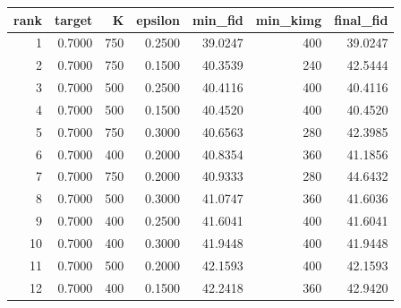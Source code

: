 \begin{tabular}{rrrrrrr}
\toprule
 rank &  target &   K &  epsilon &  min\_fid &  min\_kimg &  final\_fid \\
\midrule
    1 &  0.7000 & 750 &   0.2500 &  39.0247 &       400 &    39.0247 \\
    2 &  0.7000 & 750 &   0.1500 &  40.3539 &       240 &    42.5444 \\
    3 &  0.7000 & 500 &   0.2500 &  40.4116 &       400 &    40.4116 \\
    4 &  0.7000 & 500 &   0.1500 &  40.4520 &       400 &    40.4520 \\
    5 &  0.7000 & 750 &   0.3000 &  40.6563 &       280 &    42.3985 \\
    6 &  0.7000 & 400 &   0.2000 &  40.8354 &       360 &    41.1856 \\
    7 &  0.7000 & 750 &   0.2000 &  40.9333 &       280 &    44.6432 \\
    8 &  0.7000 & 500 &   0.3000 &  41.0747 &       360 &    41.6036 \\
    9 &  0.7000 & 400 &   0.2500 &  41.6041 &       400 &    41.6041 \\
   10 &  0.7000 & 400 &   0.3000 &  41.9448 &       400 &    41.9448 \\
   11 &  0.7000 & 500 &   0.2000 &  42.1593 &       400 &    42.1593 \\
   12 &  0.7000 & 400 &   0.1500 &  42.2418 &       360 &    42.9420 \\
\bottomrule
\end{tabular}

